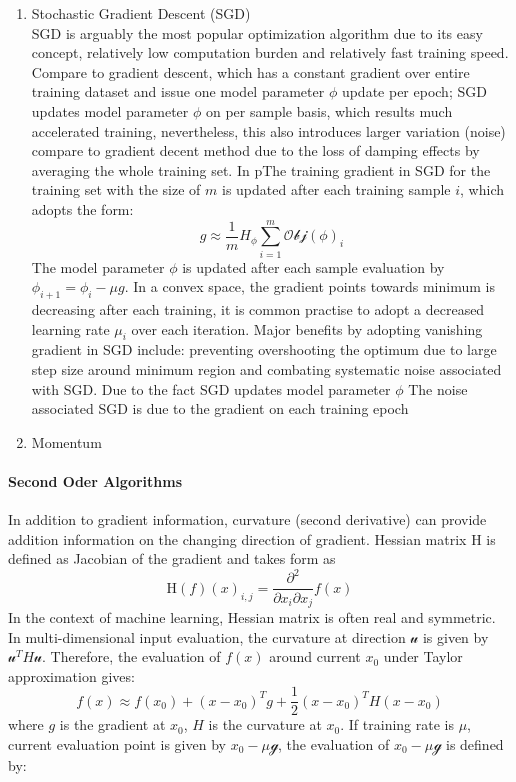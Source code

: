 \begin{enumerate}
    \item Stochastic Gradient Descent (SGD)\\
SGD is arguably the most popular optimization algorithm due to its easy concept, relatively low computation burden and relatively fast training speed. Compare to gradient descent, which has a constant gradient over entire training dataset and issue one  model parameter $\phi$ update per epoch; SGD updates model parameter $\phi$ on per sample basis, which results much accelerated training, nevertheless, this also introduces larger variation (noise) compare to gradient decent method due to the loss of damping effects by averaging the whole training set. In pThe training gradient in SGD for the training set with the size of $m$ is updated after each training sample $i$, which adopts the form: 
\begin{equation}
    g \approx \frac{1}{m}H_{\phi}\sum_{i=1}^m\mathcal{Obj}(\phi)_i
\end{equation}
The model parameter $\phi$ is updated after each sample evaluation by $\phi_{i+1} = \phi_i - \mu g$. In a convex space, the gradient points towards minimum is decreasing after each training, it is common practise to adopt a decreased learning rate $\mu_i$ over each iteration. Major benefits by adopting vanishing gradient in SGD include: preventing overshooting the optimum due to large step size around minimum region and combating systematic noise associated with SGD. Due to the fact SGD updates model parameter $\phi$ The noise associated SGD is due to the 
gradient on each training epoch 
    \item Momentum \\
\end{enumerate}

\paragraph{Second Oder Algorithms}
In addition to gradient information, curvature (second derivative) can provide addition information on the changing direction of gradient. Hessian matrix $\mathrm{H}$ is defined as Jacobian of the gradient and takes form as 
\begin{equation}
    \mathrm{H}(f)(x)_{i,j} = \frac{\partial^2}{\partial x_i \partial x_j}f(x)
\end{equation}
In the context of machine learning, Hessian matrix is often real and symmetric. In multi-dimensional input evaluation, the curvature at direction $\mathcal{u}$ is given by $\mathcal{u}^TH\mathcal{u}$. Therefore, the evaluation of $f(x)$ around current $x_0$ under Taylor approximation gives:
\begin{equation}
    \label{eq:TaylorEvaluation}
    f(x) \approx f(x_0)+(x-x_0)^Tg+\frac{1}{2}(x-x_0)^TH(x-x_0)
\end{equation}
where $g$ is the gradient at $x_0$, $H$ is the curvature at $x_0$. If training rate is $\mu$, current evaluation point is given by $x_0-\mu\mathcal{g}$, the evaluation of $x_0-\mu\mathcal{g}$ is defined by:

